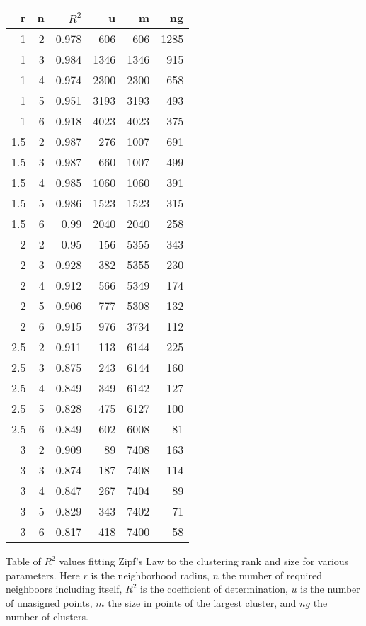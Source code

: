 \documentclass{article}
\begin{document}
\begin{center}
\begin{tabular}{|r|r|r|r|r|r|}
 r &  n  & $R^2$ & u & m & ng  \\ \hline
  1 &  2 &  0.978 & 606 & 606 & 1285 \\
  1 &  3 &  0.984 & 1346 & 1346 & 915 \\
  1 &  4 &  0.974 & 2300 & 2300 & 658 \\
  1 &  5 &  0.951 & 3193 & 3193 & 493 \\
  1 &  6 &  0.918 & 4023 & 4023 & 375 \\
  1.5 &  2 &  0.987 & 276 & 1007 & 691 \\
  1.5 &  3 &  0.987 & 660 & 1007 & 499 \\
  1.5 &  4 &  0.985 & 1060 & 1060 & 391 \\
  1.5 &  5 &  0.986 & 1523 & 1523 & 315 \\
  1.5 &  6 &  0.99 & 2040 & 2040 & 258 \\
  2 &  2 &  0.95 & 156 & 5355 & 343 \\
  2 &  3 &  0.928 & 382 & 5355 & 230 \\
  2 &  4 &  0.912 & 566 & 5349 & 174 \\
  2 &  5 &  0.906 & 777 & 5308 & 132 \\
  2 &  6 &  0.915 & 976 & 3734 & 112 \\
  2.5 &  2 &  0.911 & 113 & 6144 & 225 \\
  2.5 &  3 &  0.875 & 243 & 6144 & 160 \\
  2.5 &  4 &  0.849 & 349 & 6142 & 127 \\
  2.5 &  5 &  0.828 & 475 & 6127 & 100 \\
  2.5 &  6 &  0.849 & 602 & 6008 & 81 \\
  3 &  2 &  0.909 & 89 & 7408 & 163 \\
  3 &  3 &  0.874 & 187 & 7408 & 114 \\
  3 &  4 &  0.847 & 267 & 7404 & 89 \\
  3 &  5 &  0.829 & 343 & 7402 & 71 \\
  3 &  6 &  0.817 & 418 & 7400 & 58 
\end{tabular}
\caption{Table of $R^2$ values fitting Zipf's Law to the clustering
  rank and size for various parameters. Here $r$ is the neighborhood
  radius, $n$ the number of required neighboors including itself,
  $R^2$ is the coefficient of determination, $u$ is the number of
  unasigned points, $m$ the size in points of the largest
  cluster, and $ng$ the number of clusters. }
\label{tablarquad}
\end{center}
\end{document}
